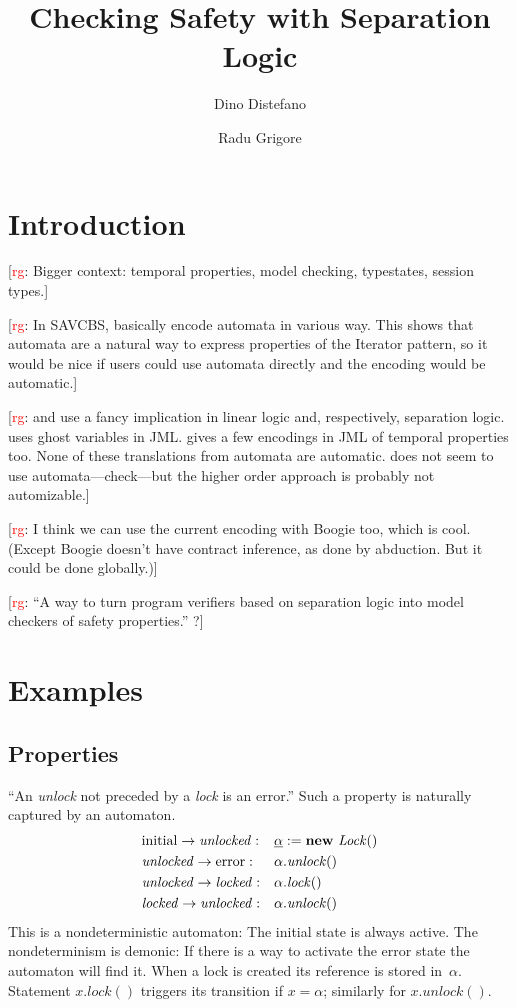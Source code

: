 \documentclass[a4paper]{article}
\title{Checking Safety with Separation Logic}
\author{Dino Distefano \and Radu Grigore}
\newcommand{\todo}[2]{{\small [\textcolor{red}{#1}: #2]}}
\newcommand{\rg}[1]{\todo{rg}{#1}}
\newcommand{\pat}{\underline}
\newcommand{\new}[1]{\text{\textbf{new} \textit{#1}}}
\theoremstyle{remark}
\begin{document}
\maketitle
\section{Introduction} %

\rg{Bigger context: temporal properties, model checking, typestates, session types.}

\rg{In SAVCBS, \cite{cok2006,bierhoff2006} basically encode automata in various way. This shows that automata are a natural way to express properties of the Iterator pattern, so it would be nice if users could use automata directly and the encoding would be automatic.}

\rg{\cite{bierhoff2006} and \cite{haack2009} use a fancy implication in linear logic and, respectively, separation logic. \cite{cok2006} uses ghost variables in JML. \cite{trentelman2002} gives a few encodings in JML of temporal properties too. None of these translations from automata are automatic. \cite{krishnaswami2006} does not seem to use automata---check---but the higher order approach is probably not automizable.}

\rg{I think we can use the current encoding with Boogie too, which is cool. (Except Boogie doesn't have contract inference, as done by abduction. But it could be done globally.)}

\rg{``A way to turn program verifiers based on separation logic into model checkers of safety properties.'' ?}

\section{Examples} %
\subsection{Properties}\label{sec:properties} %

``An \textit{unlock} not preceded by a \textit{lock} is an error.''
Such a property is naturally captured by an automaton.
\begin{equation}\label{eq:unlockunlock}
\begin{aligned}
&\mathrm{initial}\to\mathit{unlocked}: &&\pat\alpha := \new{Lock}()\\
&\mathit{unlocked}\to\mathrm{error}: &&\alpha.\mathit{unlock}()\\
&\mathit{unlocked}\to\mathit{locked}: &&\alpha.\mathit{lock}()\\
&\mathit{locked}\to\mathit{unlocked}: &&\alpha.\mathit{unlock}()
\end{aligned}
\end{equation}
This is a nondeterministic automaton:
The initial state is always active.
The nondeterminism is demonic:
If there is a way to activate the error state the automaton will find it.
When a lock is created its reference is stored in~$\alpha$.
Statement $x.\mathit{lock}()$ triggers its transition if $x=\alpha$;
similarly for $x.\mathit{unlock}()$.
\end{document}
